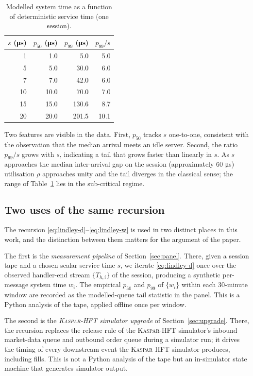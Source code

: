 \documentclass[11pt]{article}
\newcommand{\kasparhft}{\textsc{Kaspar-HFT}}
\begin{document}
\begin{table}[htbp]
\centering
\caption{Modelled system time as a function of deterministic service time (one session).}
\label{tab:sweep}
\begin{tabular}{@{}rrrr@{}}
\toprule
$s$ (\si{\micro\second}) & $p_{50}$ (\si{\micro\second}) & $p_{99}$ (\si{\micro\second}) & $p_{99}/s$ \\
\midrule
1  & 1.0  & 5.0   & 5.0 \\
5  & 5.0  & 30.0  & 6.0 \\
7  & 7.0  & 42.0  & 6.0 \\
10 & 10.0 & 70.0  & 7.0 \\
15 & 15.0 & 130.6 & 8.7 \\
20 & 20.0 & 201.5 & 10.1 \\
\bottomrule
\end{tabular}
\end{table}

Two features are visible in the data. First, $p_{50}$ tracks $s$ one-to-one, consistent with the observation that the median arrival meets an idle server. Second, the ratio $p_{99}/s$ grows with $s$, indicating a tail that grows faster than linearly in $s$. As $s$ approaches the median inter-arrival gap on the session (approximately 60 \si{\micro\second}) utilisation $\rho$ approaches unity and the tail diverges in the classical sense; the range of Table~\ref{tab:sweep} lies in the sub-critical regime.

\subsection{Two uses of the same recursion}
\label{sec:queue-identity}

The recursion \eqref{eq:lindley-d}--\eqref{eq:lindley-w} is used in two distinct places in this work, and the distinction between them matters for the argument of the paper.

The first is the \emph{measurement pipeline} of Section~\ref{sec:panel}. There, given a session tape and a chosen scalar service time $s$, we iterate \eqref{eq:lindley-d} once over the observed handler-end stream $\{T_{h,i}\}$ of the session, producing a synthetic per-message system time $w_i$. The empirical $p_{50}$ and $p_{99}$ of $\{w_i\}$ within each 30-minute window are recorded as the modelled-queue tail statistic in the panel. This is a Python analysis of the tape, applied offline once per window.

The second is the \emph{\kasparhft{} simulator upgrade} of Section~\ref{sec:upgrade}. There, the recursion replaces the release rule of the \kasparhft{} simulator's inbound market-data queue and outbound order queue during a simulator run; it drives the timing of every downstream event the \kasparhft{} simulator produces, including fills. This is not a Python analysis of the tape but an in-simulator state machine that generates simulator output.
\end{document}
